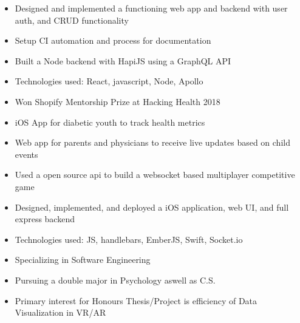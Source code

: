 

\begin{itemize}
\item Designed and implemented a functioning web app and backend with user auth, and CRUD functionality
\item Setup CI automation and process for documentation 
\item Built a Node backend with HapiJS using a GraphQL API
\item Technologies used: React, javascript, Node, Apollo
\end{itemize}

\divider

\begin{itemize}
\item Won Shopify Mentorship Prize at Hacking Health 2018
\item iOS App for diabetic youth to track health metrics
\item Web app for parents and physicians to receive live updates based on child events
\end{itemize}

\divider

\begin{itemize}
\item Used a open source api to build a websocket based multiplayer competitive game
\item Designed, implemented, and deployed a iOS application, web UI, and full express backend
\item Technologies used: JS, handlebars, EmberJS, Swift, Socket.io
\end{itemize}

\divider




\begin{itemize}
\item Specializing in Software Engineering
\item Pursuing a double major in Psychology aswell as C.S. 
\item Primary interest for Honours Thesis/Project is efficiency of Data Visualization in VR/AR
\end{itemize}
{}

